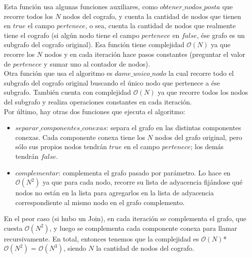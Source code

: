 \normalsize{}
Esta función usa algunas funciones auxiliares, como $obtener\_nodos\_posta$ que recorre todos los $N$ nodos del cografo, y cuenta la cantidad de nodos que tienen en $true$ el campo $pertenece$, o sea, cuenta la cantidad de nodos que realmente tiene el cografo (si algún nodo tiene el campo $pertenece$ en $false$, ése grafo es un subgrafo del cografo original). Esa función tiene complejidad $\mathcal{O}(N)$ ya que recorre los $N$ nodos y en cada iteración hace pasos constantes (preguntar el valor de $pertenece$ y sumar uno al contador de nodos).\\
Otra función que usa el algoritmo es $dame\_unico\_nodo$ la cual recorre todo el subgrafo del cografo original buscando el único nodo que pertenece a ése subgrafo. También cuenta con complejidad $\mathcal{O}(N)$ ya que recorre todos los nodos del subgrafo y realiza operaciones constantes en cada iteración. \\
Por último, hay otras dos funciones que ejecuta el algoritmo:
\begin{itemize}
	\item $separar\_componentes\_conexas$: separa el grafo en las distintas componentes conexas. Cada componente conexa tiene los $N$ nodos del grafo original, pero sólo sus propios nodos tendrán $true$ en el campo $pertenece$; los demás tendrán $false$.
    \item $complementar$: complementa el grafo pasado por parámetro. Lo hace en $\mathcal{O}(N^2)$ ya que para cada nodo, recorre su lista de adyacencia fijándose qué nodos no están en la lista para agregarlos en la lista de adyacencia correspondiente al mismo nodo en el grafo complemento.
\end{itemize}
En el peor caso (si hubo un Join), en cada iteración se complementa el grafo, que cuesta $\mathcal{O}(N^2)$, y luego se complementa cada componente conexa para llamar recursivamente. En total, entonces tenemos que la complejidad es $\mathcal{O}(N)$*$\mathcal{O}(N^2)$ = $\mathcal{O}(N^3)$, siendo $N$ la cantidad de nodos del cografo. \\ 


